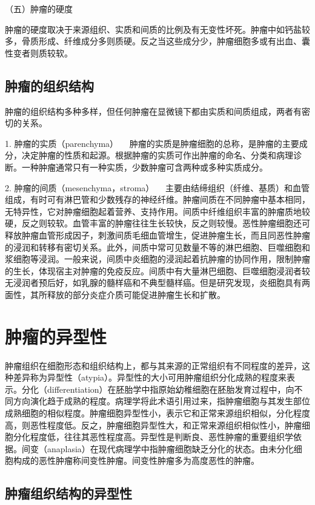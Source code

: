{（五）肿瘤的硬度}

肿瘤的硬度取决于来源组织、实质和间质的比例及有无变性坏死。肿瘤中如钙盐较多，骨质形成、纤维成分多则质硬。反之当这些成分少，肿瘤细胞多或有出血、囊性变者则质较软。

\subsection{肿瘤的组织结构}

肿瘤的组织结构多种多样，但任何肿瘤在显微镜下都由实质和间质组成，两者有密切的关系。

{1. 肿瘤的实质（parenchyma）}
　肿瘤的实质是肿瘤细胞的总称，是肿瘤的主要成分，决定肿瘤的性质和起源。根据肿瘤的实质可作出肿瘤的命名、分类和病理诊断。一种肿瘤通常只有一种实质，少数肿瘤可含两种或多种实质成分。

{2. 肿瘤的间质（mesenchyma，stroma）}
　主要由结缔组织（纤维、基质）和血管组成，有时可有淋巴管和少数残存的神经纤维。肿瘤间质在不同肿瘤中基本相同，无特异性，它对肿瘤细胞起着营养、支持作用。间质中纤维组织丰富的肿瘤质地较硬，反之则较软。血管丰富的肿瘤往往生长较快，反之则较慢。恶性肿瘤细胞还可释放肿瘤血管形成因子，刺激间质毛细血管增生，促进肿瘤生长，而且同恶性肿瘤的浸润和转移有密切关系。此外，间质中常可见数量不等的淋巴细胞、巨噬细胞和浆细胞等浸润。一般来说，间质中炎细胞的浸润起着抗肿瘤的协同作用，限制肿瘤的生长，体现宿主对肿瘤的免疫反应。间质中有大量淋巴细胞、巨噬细胞浸润者较无浸润者预后好，如乳腺的髓样癌和不典型髓样癌。但是研究发现，炎细胞具有两面性，其所释放的部分炎症介质可能促进肿瘤生长和扩散。

\section{肿瘤的异型性}

肿瘤组织在细胞形态和组织结构上，都与其来源的正常组织有不同程度的差异，这种差异称为异型性（atypia）。异型性的大小可用肿瘤组织分化成熟的程度来表示。分化（differentiation）在胚胎学中指原始幼稚细胞在胚胎发育过程中，向不同方向演化趋于成熟的程度。病理学将此术语引用过来，指肿瘤细胞与其发生部位成熟细胞的相似程度。肿瘤细胞异型性小，表示它和正常来源组织相似，分化程度高，则恶性程度低。反之，肿瘤细胞异型性大，和正常来源组织相似性小，肿瘤细胞分化程度低，往往其恶性程度高。异型性是判断良、恶性肿瘤的重要组织学依据。间变（anaplasia）在现代病理学中指肿瘤细胞缺乏分化的状态。由未分化细胞构成的恶性肿瘤称间变性肿瘤。间变性肿瘤多为高度恶性的肿瘤。

\subsection{肿瘤组织结构的异型性}

